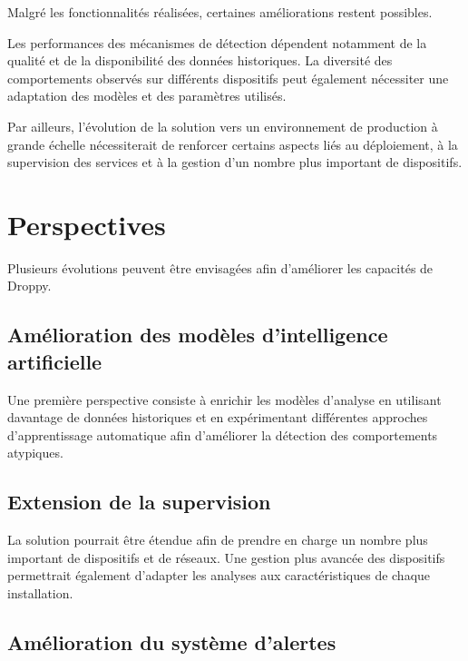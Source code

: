 Malgré les fonctionnalités réalisées, certaines améliorations restent
possibles.

Les performances des mécanismes de détection dépendent notamment de la
qualité et de la disponibilité des données historiques. La diversité des
comportements observés sur différents dispositifs peut également nécessiter
une adaptation des modèles et des paramètres utilisés.

Par ailleurs, l'évolution de la solution vers un environnement de production
à grande échelle nécessiterait de renforcer certains aspects liés au
déploiement, à la supervision des services et à la gestion d'un nombre plus
important de dispositifs.



\section{Perspectives}

Plusieurs évolutions peuvent être envisagées afin d'améliorer les capacités
de Droppy.

\subsection{Amélioration des modèles d'intelligence artificielle}

Une première perspective consiste à enrichir les modèles d'analyse en
utilisant davantage de données historiques et en expérimentant différentes
approches d'apprentissage automatique afin d'améliorer la détection des
comportements atypiques.

\subsection{Extension de la supervision}

La solution pourrait être étendue afin de prendre en charge un nombre plus
important de dispositifs et de réseaux. Une gestion plus avancée des
dispositifs permettrait également d'adapter les analyses aux caractéristiques
de chaque installation.

\subsection{Amélioration du système d'alertes}

